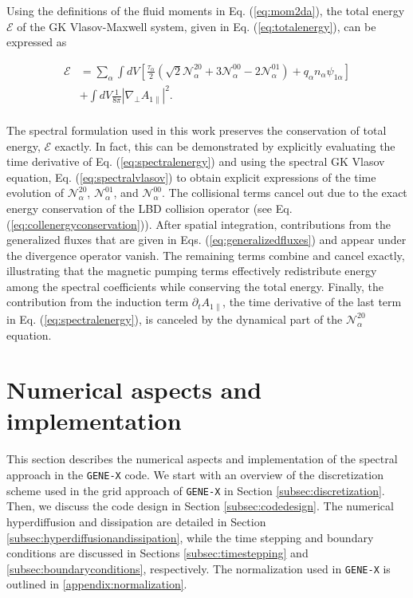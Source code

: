 \documentclass[preprint,12pt]{elsarticle}
\begin{document}
 Using the definitions of the fluid moments in Eq. (\ref{eq:mom2da}), the total energy $\mathcal{E}$ of the GK Vlasov-Maxwell system, given in Eq. (\ref{eq:totalenergy}), can be expressed as

\begin{align} \label{eq:spectralenergy}
  \mathcal{E} & = \sum_\alpha \int dV \left[ \frac{\tau_\alpha}{2} \left( \sqrt{2} \mathcal{N}_\alpha^{20} + 3 \mathcal{N}_\alpha^{00} - 2 \mathcal{N}_\alpha^{01} \right) + q_\alpha n_\alpha \psi_{1 \alpha} \right] \nonumber \\
  & + \int dV \frac{1}{8 \pi} \left|\nabla_{\perp} A_{1 \|}\right|^2.
\end{align}
\\
The spectral formulation used in this work preserves the conservation of total energy, $\mathcal{E}$ exactly. In fact, this can be demonstrated by explicitly evaluating the time derivative of Eq. (\ref{eq:spectralenergy}) and using the spectral GK Vlasov equation, Eq. (\ref{eq:spectralvlasov}) to obtain explicit expressions of the time evolution of $\mathcal{N}_\alpha^{20}$, $\mathcal{N}_\alpha^{01}$, and $\mathcal{N}_\alpha^{00}$. The collisional terms cancel out due to the exact energy conservation of the LBD collision operator (see Eq. (\ref{eq:collenergyconservation})). After spatial integration, contributions from the generalized fluxes that are given in Eqs. (\ref{eq:generalizedfluxes}) and appear under the divergence operator vanish. The remaining terms combine and cancel exactly, illustrating that the magnetic pumping terms effectively redistribute energy among the spectral coefficients while conserving the total energy. Finally, the contribution from the induction term $\partial_t A_{1 \parallel}$, the time derivative of the last term in Eq. (\ref{eq:spectralenergy}), is canceled by the dynamical part of the $\mathcal{N}_\alpha^{20}$ equation.

\section{Numerical aspects and implementation}
\label{sec:numericalimplementation}

This section describes the numerical aspects and implementation of the spectral approach in the \verb|GENE-X| code. We start with an overview of the discretization scheme used in the grid approach of \verb|GENE-X| in Section \ref{subsec:discretization}. Then, we discuss the code design in Section \ref{subsec:codedesign}. The numerical hyperdiffusion and dissipation are detailed in Section \ref{subsec:hyperdiffusionandissipation}, while the time stepping and boundary conditions are discussed in Sections \ref{subsec:timestepping} and \ref{subsec:boundaryconditions}, respectively. The normalization used in \verb|GENE-X| is outlined in \ref{appendix:normalization}.
\end{document}
